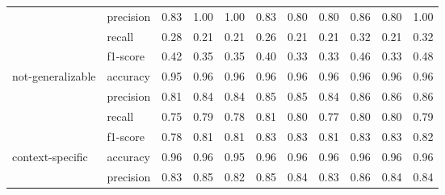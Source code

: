 \begin{tabular}{llrrrrrrrrr}
                 & precision &                    0.83 &                    1.00 &                    1.00 &                    0.83 &                    0.80 &                    0.80 &                    0.86 &                    0.80 &                    1.00 \\
                 & recall &                    0.28 &                    0.21 &                    0.21 &                    0.26 &                    0.21 &                    0.21 &                    0.32 &                    0.21 &                    0.32 \\
                 & f1-score &                    0.42 &                    0.35 &                    0.35 &                    0.40 &                    0.33 &                    0.33 &                    0.46 &                    0.33 &                    0.48 \\
not-generalizable & accuracy &                    0.95 &                    0.96 &                    0.96 &                    0.96 &                    0.96 &                    0.96 &                    0.96 &                    0.96 &                    0.96 \\
                 & precision &                    0.81 &                    0.84 &                    0.84 &                    0.85 &                    0.85 &                    0.84 &                    0.86 &                    0.86 &                    0.86 \\
                 & recall &                    0.75 &                    0.79 &                    0.78 &                    0.81 &                    0.80 &                    0.77 &                    0.80 &                    0.80 &                    0.79 \\
                 & f1-score &                    0.78 &                    0.81 &                    0.81 &                    0.83 &                    0.83 &                    0.81 &                    0.83 &                    0.83 &                    0.82 \\
context-specific & accuracy &                    0.96 &                    0.96 &                    0.95 &                    0.96 &                    0.96 &                    0.96 &                    0.96 &                    0.96 &                    0.96 \\
                 & precision &                    0.83 &                    0.85 &                    0.82 &                    0.85 &                    0.84 &                    0.83 &                    0.86 &                    0.84 &                    0.84 \\

\end{tabular}
